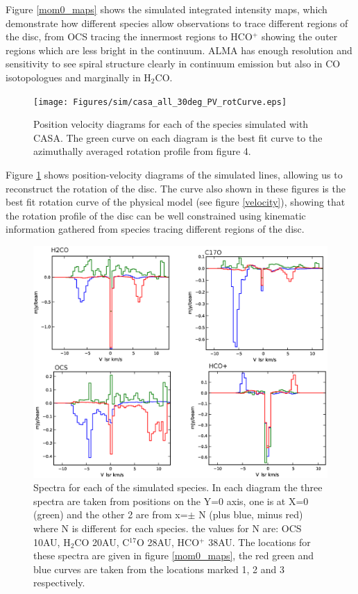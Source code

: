 \documentclass[useAMS,usenatbib]{mn2e}
\begin{document}
Figure \ref{mom0_maps} shows the simulated integrated intensity maps, which demonstrate how different species allow observations to trace different regions of the disc, from OCS tracing the innermost regions to HCO$^+$ showing the outer regions which are less bright in the continuum. ALMA has enough resolution and sensitivity to see spiral structure clearly in continuum emission but also in CO isotopologues and marginally in H$_2$CO.\newline


\begin{figure}
 \texttt{[image: Figures/sim/casa\_all\_30deg\_PV\_rotCurve.eps]}
 \caption{Position velocity diagrams for each of the species simulated with CASA. The green curve on each diagram is the best fit curve to the azimuthally averaged rotation profile from figure 4.}
 \label{pvs}
\end{figure}

Figure \ref{pvs} shows position-velocity diagrams of the simulated lines, allowing us to reconstruct the rotation of the disc. The curve also shown in these figures is the best fit rotation curve of the physical model (see figure \ref{velocity}), showing that the rotation profile of the disc can be well constrained using kinematic information gathered from species tracing different regions of the disc.\newline
\begin{figure}
 \includegraphics[width=168mm]{Figures/sim/casa_all_spectra.eps}

 \caption{Spectra for each of the simulated species. In each diagram the three spectra are taken from positions on the Y=0 axis, one is at X=0 (green) and the other 2 are from x=$\pm$ N (plus blue, minus red) where N is different for each species. the values for N are: OCS 10AU, H$_2$CO 20AU, C$^{17}$O 28AU, HCO$^+$ 38AU. The locations for these spectra are given in figure \ref{mom0_maps}, the red green and blue curves are taken from the locations marked 1, 2 and 3 respectively.}
 \label{spectra}
\end{figure}
\end{document}
